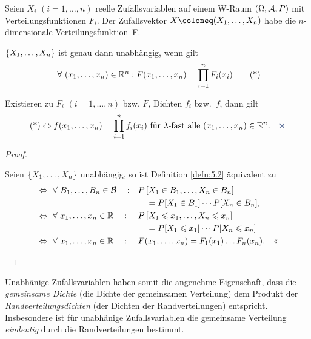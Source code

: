 \begin{prop}
\label{prop:5.3}
Seien $X_{i}$ $(i=1,\ldots,n)$ reelle Zufallsvariablen auf einem W-Raum
$(\Omega, \AA,P)$ mit Verteilungsfunktionen $F_{i}$. Der Zufallsvektor
$X\defl (X_{1},\ldots ,X_{n})$ habe die $n$-dimensionale Verteilungsfunktion\ F.\\[-7mm]
\begin{propenum}
\item
$\setd{X_{1},\ldots ,X_{n}}$ ist genau dann unabhängig, wenn gilt
\begin{align*}
\forall {(x_{1},\ldots, x_{n})\in \R^ {n}} : F(x_{1},\ldots, x_{n}) =
\prod\limits^ {n}_{i=1} F_{i}(x_{i})\tag{*}
\end{align*}
\item
Existieren  zu $F_{i}$ $(i=1,\ldots,n)$ bzw. $F$, Dichten $f_{i}$ bzw.\ $f$,
dann gilt
\begin{align*}
\text{(*)}
\Leftrightarrow 
f(x_{1},\ldots,x_{n})=\prod\limits_{i=1}^ {n} f_{i}(x_{i})
\text{ für $\lambda$-fast alle }(x_{1},\ldots, x_{n}) \in
\R^n.\fishhere
\end{align*}
\end{propenum}
\end{prop}
\begin{proof}
\begin{proofenum}
  \item Seien $\setd{X_1,\ldots,X_n}$ unabhängig, so ist 
  Definition \ref{defn:5.2} äquivalent zu
\begin{align*}
&\Leftrightarrow \forall B_1,\ldots,B_n\in\BB\quad:  &&P\left[X_1\in
B_1,\ldots,X_n\in B_n\right]\\ &&&\quad = P[X_1\in B_1]\cdots P[X_n\in B_n],\\
&\Leftrightarrow
\forall x_1,\ldots,x_n\in \R\quad: && P\left[X_1\le x_1,\ldots,X_n\le x_n\right]
\\ &&&\quad = P[X_1\le x_1]\cdots P[X_n\le x_n]\\
&\Leftrightarrow
\forall x_1,\ldots,x_n\in \R\quad: && F(x_1,\ldots,x_n) = F_1(x_1)\ldots
F_n(x_n).\qedhere
\end{align*}
\end{proofenum}
\end{proof}

Unabhänige Zufallsvariablen haben somit die angenehme Eigenschaft, dass die
\emph{gemeinsame Dichte} (die Dichte der gemeinsamen Verteilung) dem Produkt
der \emph{Randverteilungsdichten} (der Dichten der Randverteilungen) entspricht.
Insbesondere ist für unabhänige Zufallsvariablen die gemeinsame Verteilung
\textit{eindeutig} durch die Randverteilungen bestimmt.

